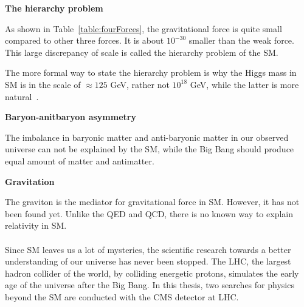 {\bf The hierarchy problem}

As shown in Table~\ref{table:fourForces}, the gravitational force is quite small compared 
to other three forces. It is about $10^{-30}$ smaller than the weak force. 
This large discrepancy of scale is called the 
hierarchy problem of the SM. 

The more formal way to state the hierarchy problem is why the Higgs mass in SM is in the scale of
${\approx}125$ GeV, 
rather not $10^{18}$ GeV, while the latter is more natural~\cite{wb:hierarchy}. 

{\bf Baryon-anitbaryon asymmetry }

The imbalance in baryonic matter and anti-baryonic matter in our observed universe
can not be explained by the SM, while the Big Bang should produce equal amount of 
matter and antimatter. 


{\bf Gravitation}

 The graviton is the mediator for gravitational force in SM. However, it has not been found yet. 
 Unlike the QED and QCD, there is no known way to explain relativity in SM. 
 \\
 \\
 Since SM leaves us a lot of mysteries,  the scientific research towards a better understanding of 
 our universe has never been stopped. 
 The LHC, the largest hadron collider of the world, by colliding energetic protons, simulates the early age of the universe after the Big Bang. 
 In this thesis, two searches for physics beyond the SM are 
 conducted with the CMS detector at LHC. 





